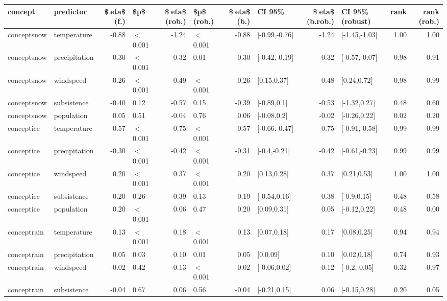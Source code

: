 \begin{table}[ht]
\centering
\begin{tabular}{llrlrlrlrlrr}
  \hline
concept & predictor & \$eta\$ (f.) & \$p\$ & \$eta\$ (rob.) & \$p\$ (rob.) & \$eta\$ (b.) & CI 95\% & \$eta\$ (b.rob.) & CI 95\% (robust) & rank & rank (rob.) \\ 
  \hline
conceptsnow & temperature & -0.88 & $<$ 0.001 & -1.24 & $<$ 0.001 & -0.88 & [-0.99,-0.76] & -1.24 & [-1.45,-1.03] & 1.00 & 1.00 \\ 
  conceptsnow & precipitation & -0.30 & $<$ 0.001 & -0.32 & 0.01 & -0.30 & [-0.42,-0.19] & -0.32 & [-0.57,-0.07] & 0.98 & 0.91 \\ 
  conceptsnow & windspeed & 0.26 & $<$ 0.001 & 0.49 & $<$ 0.001 & 0.26 & [0.15,0.37] & 0.48 & [0.24,0.72] & 0.98 & 0.99 \\ 
  conceptsnow & subsistence & -0.40 & 0.12 & -0.57 & 0.15 & -0.39 & [-0.89,0.1] & -0.53 & [-1.32,0.27] & 0.48 & 0.60 \\ 
  conceptsnow & population & 0.05 & 0.51 & -0.04 & 0.76 & 0.06 & [-0.08,0.2] & -0.02 & [-0.26,0.22] & 0.02 & 0.20 \\ 
  conceptice & temperature & -0.57 & $<$ 0.001 & -0.75 & $<$ 0.001 & -0.57 & [-0.66,-0.47] & -0.75 & [-0.91,-0.58] & 0.99 & 0.99 \\ 
  conceptice & precipitation & -0.30 & $<$ 0.001 & -0.42 & $<$ 0.001 & -0.31 & [-0.4,-0.21] & -0.42 & [-0.61,-0.23] & 0.99 & 0.99 \\ 
  conceptice & windspeed & 0.20 & $<$ 0.001 & 0.37 & $<$ 0.001 & 0.20 & [0.13,0.28] & 0.37 & [0.21,0.53] & 1.00 & 1.00 \\ 
  conceptice & subsistence & -0.20 & 0.26 & -0.39 & 0.13 & -0.19 & [-0.54,0.16] & -0.38 & [-0.9,0.15] & 0.48 & 0.58 \\ 
  conceptice & population & 0.20 & $<$ 0.001 & 0.06 & 0.47 & 0.20 & [0.09,0.31] & 0.05 & [-0.12,0.22] & 0.48 & 0.00 \\ 
  conceptrain & temperature & 0.13 & $<$ 0.001 & 0.18 & $<$ 0.001 & 0.13 & [0.07,0.18] & 0.17 & [0.08,0.25] & 0.94 & 0.94 \\ 
  conceptrain & precipitation & 0.05 & 0.03 & 0.10 & 0.01 & 0.05 & [0,0.09] & 0.10 & [0.02,0.18] & 0.74 & 0.93 \\ 
  conceptrain & windspeed & -0.02 & 0.42 & -0.13 & $<$ 0.001 & -0.02 & [-0.06,0.02] & -0.12 & [-0.2,-0.05] & 0.32 & 0.97 \\ 
  conceptrain & subsistence & -0.04 & 0.67 & 0.06 & 0.56 & -0.04 & [-0.21,0.15] & 0.06 & [-0.15,0.28] & 0.20 & 0.05 \\ 

\end{tabular}
\end{table}
